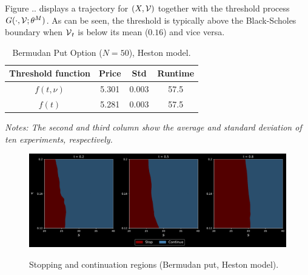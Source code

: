 
Figure .. displays a trajectory for $(X,\operatorname{\mathcal{V}})$ together with the threshold process $G(\cdot,\operatorname{\mathcal{V}};\theta^M)$. As can be seen, the threshold is typically above the Black-Scholes boundary when $\operatorname{\mathcal{V}}_t$ is below its mean ($0.16$) and vice versa. 

\begin{table}[ht]
  \centering
  \caption{Bermudan Put Option ($N=50$), Heston model.  
 }
  \begin{tabular}{|c| c| c| c| }
 \hline
  Threshold function &  Price&  Std& Runtime  \\
  \hline 
    $f(t,\nu)$ & 5.301 & 0.003 &  57.5 \\
  $f(t)$ & 5.281 & 0.003 &  57.5  \\
  \hline
\end{tabular}
\vspace{2mm}

\scriptsize{
\textit{Notes: The second and third column show the average and standard deviation of ten experiments, respectively.  }}
\label{tab:resultPutBS}
  \end{table}
  
\begin{figure}
    \centering
     \caption{Stopping and continuation regions (Bermudan put, Heston model).}
    \includegraphics[scale = 0.42]{FB/Figures/2DPlotHeston.pdf}
    \label{fig:asymCall}
\end{figure}






